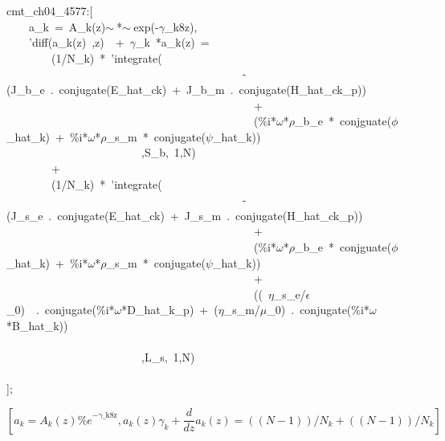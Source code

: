 \documentclass[fleqn]{article}
\begin{document}
\begin{minipage}[t]{\textwidth}\color{blue}
cmt\_ch04\_4577:[\\
\ \ \ \ a\_k\ =\ A\_k(z)\ensuremath{\sim\ }*\ensuremath{\sim\ }exp(-\ensuremath{\gamma}\_k8z),\\
\ \ \ \ 'diff(a\_k(z)\ ,z)\ \ +\ \ensuremath{\gamma}\_k\ *a\_k(z)\ =\ \\
\ \ \ \ \ \ \ \ (1/N\_k)\ *\ 'integrate(\ \\
\ \ \ \ \ \ \ \ \ \ \ \ \ \ \ \ \ \ \ \ \ \ \ \ \ \ \ \ \ \ \ \ \ \ \ \ \ \ \ \ \ \ -(J\_b\_e\ .\ conjugate(E\_hat\_ck)\ +\ J\_b\_m\ .\ conjugate(H\_hat\_ck\_p))\ \\
\ \ \ \ \ \ \ \ \ \ \ \ \ \ \ \ \ \ \ \ \ \ \ \ \ \ \ \ \ \ \ \ \ \ \ \ \ \ \ \ \ \ \ \ +\\
\ \ \ \ \ \ \ \ \ \ \ \ \ \ \ \ \ \ \ \ \ \ \ \ \ \ \ \ \ \ \ \ \ \ \ \ \ \ \ \ \ \ \ \ (\%i*\ensuremath{\omega}*\ensuremath{\rho}\_b\_e\ *\ conjguate(\ensuremath{\phi}\_hat\_k)\ +\ \%i*\ensuremath{\omega}*\ensuremath{\rho}\_s\_m\ *\ conjugate(\ensuremath{\psi}\_hat\_k))\ \\
\ \ \ \ \ \ \ \ \ \ \ \ \ \ \ \ \ \ \ \ \ \ \ \ ,S\_b,\ 1,N)\\
\ \ \ \ \ \ \ \ +\\
\ \ \ \ \ \ \ \ (1/N\_k)\ *\ 'integrate(\ \\
\ \ \ \ \ \ \ \ \ \ \ \ \ \ \ \ \ \ \ \ \ \ \ \ \ \ \ \ \ \ \ \ \ \ \ \ \ \ \ \ \ \ -(J\_s\_e\ .\ conjugate(E\_hat\_ck)\ +\ J\_s\_m\ .\ conjugate(H\_hat\_ck\_p))\ \\
\ \ \ \ \ \ \ \ \ \ \ \ \ \ \ \ \ \ \ \ \ \ \ \ \ \ \ \ \ \ \ \ \ \ \ \ \ \ \ \ \ \ \ \ +\\
\ \ \ \ \ \ \ \ \ \ \ \ \ \ \ \ \ \ \ \ \ \ \ \ \ \ \ \ \ \ \ \ \ \ \ \ \ \ \ \ \ \ \ \ (\%i*\ensuremath{\omega}*\ensuremath{\rho}\_b\_e\ *\ conjguate(\ensuremath{\phi}\_hat\_k)\ +\ \%i*\ensuremath{\omega}*\ensuremath{\rho}\_s\_m\ *\ conjugate(\ensuremath{\psi}\_hat\_k))\ \\
\ \ \ \ \ \ \ \ \ \ \ \ \ \ \ \ \ \ \ \ \ \ \ \ \ \ \ \ \ \ \ \ \ \ \ \ \ \ \ \ \ \ \ \ +\\
\ \ \ \ \ \ \ \ \ \ \ \ \ \ \ \ \ \ \ \ \ \ \ \ \ \ \ \ \ \ \ \ \ \ \ \ \ \ \ \ \ \ \ \ ((\ \ensuremath{\eta}\_s\_e/\ensuremath{\epsilon}\_0)\ \ .\ conjugate(\%i*\ensuremath{\omega}*D\_hat\_k\_p)\ +\ (\ensuremath{\eta}\_s\_m/\ensuremath{\mu}\_0)\ .\ conjugate(\%i*\ensuremath{\omega}*B\_hat\_k))\\
\\
\ \ \ \ \ \ \ \ \ \ \ \ \ \ \ \ \ \ \ \ \ \ \ \ ,L\_s,\ 1,N)\\
\\
];
\end{minipage}
\[\displaystyle \tag{\% o398} 
\operatorname{[}{a_k}={A_k}(z) {{\% e}^{-\ensuremath{\mathrm{\gamma \_ k8z}}}}\operatorname{,}{a_k}(z) {{\gamma }_k}+\frac{d}{d z} {a_k}(z)=\left( \left( N-1\right)  \right) /{N_k}+\left( \left( N-1\right)  \right) /{N_k}\operatorname{]}\mbox{}
\]
\end{document}
